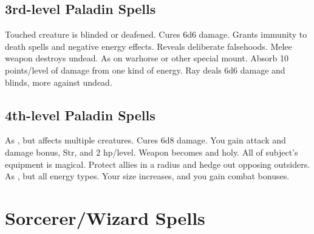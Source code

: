 \subsection{3rd-level Paladin Spells}
\begin{spelllist} 
   Touched creature is blinded or deafened.
   Cures 6d6 damage.
   Grants immunity to death spells and negative energy effects.
   Reveals deliberate falsehoods.
   Melee weapon destroys undead.
   As  on warhorse or other special mount.
   Absorb 10 points/level of damage from one kind of energy.
   Ray deals 6d6 damage and blinds, more against undead.
\end{spelllist}

\subsection{4th-level Paladin Spells}
\begin{spelllist}
   As , but affects multiple creatures.
   Cures 6d8 damage.
   You gain attack and damage bonus,  Str, and 2 hp/level.
   Weapon becomes  and holy.
   All of subject's equipment is magical.
   Protect allies in a \areamed radius and hedge out opposing outsiders.
   As , but all energy types. 
   Your size increases, and you gain combat bonuses.
\end{spelllist}

\section{Sorcerer/Wizard Spells}
